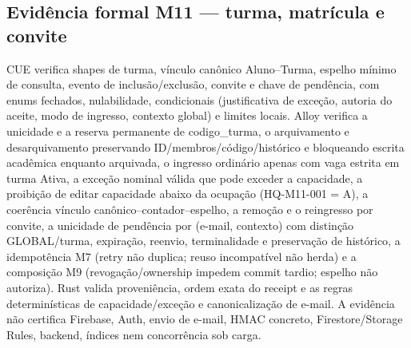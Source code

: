 \subsection*{Evidência formal M11 --- turma, matrícula e convite}
CUE verifica shapes de turma, vínculo canônico Aluno--Turma, espelho mínimo de consulta, evento de inclusão/exclusão, convite e chave de pendência, com enums fechados, nulabilidade, condicionais (justificativa de exceção, autoria do aceite, modo de ingresso, contexto global) e limites locais. Alloy verifica a unicidade e a reserva permanente de codigo\_turma, o arquivamento e desarquivamento preservando ID/membros/código/histórico e bloqueando escrita acadêmica enquanto arquivada, o ingresso ordinário apenas com vaga estrita em turma Ativa, a exceção nominal válida que pode exceder a capacidade, a proibição de editar capacidade abaixo da ocupação (HQ-M11-001 = A), a coerência vínculo canônico--contador--espelho, a remoção e o reingresso por convite, a unicidade de pendência por (e-mail, contexto) com distinção GLOBAL/turma, expiração, reenvio, terminalidade e preservação de histórico, a idempotência M7 (retry não duplica; reuso incompatível não herda) e a composição M9 (revogação/ownership impedem commit tardio; espelho não autoriza). Rust valida proveniência, ordem exata do receipt e as regras determinísticas de capacidade/exceção e canonicalização de e-mail. A evidência não certifica Firebase, Auth, envio de e-mail, HMAC concreto, Firestore/Storage Rules, backend, índices nem concorrência sob carga.
